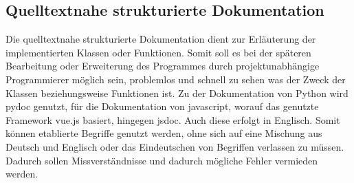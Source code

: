 \subsection{Quelltextnahe strukturierte Dokumentation}
Die quelltextnahe strukturierte Dokumentation dient zur Erläuterung der implementierten Klassen oder Funktionen. Somit soll es bei der späteren Bearbeitung oder Erweiterung des Programmes durch projektunabhängige Programmierer möglich sein, problemlos und schnell zu sehen was der Zweck der Klassen beziehungsweise Funktionen ist. Zu der Dokumentation von Python wird pydoc genutzt, für die Dokumentation von javascript, worauf das genutzte Framework vue.js basiert, hingegen jsdoc. Auch diese erfolgt in Englisch. Somit können etablierte Begriffe genutzt werden, ohne sich auf eine Mischung aus Deutsch und Englisch oder das Eindeutschen von Begriffen verlassen zu müssen. Dadurch sollen Missverständnisse und dadurch mögliche Fehler vermieden werden.